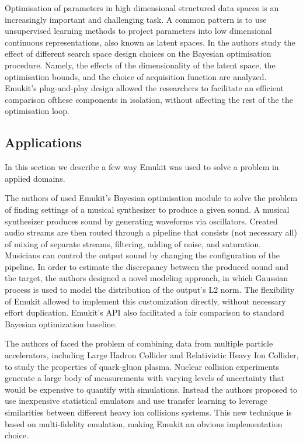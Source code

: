 Optimisation of parameters in high dimensional structured data spaces is an increasingly important and challenging task. A common pattern is to use unsupervised learning methods to project parameters into low dimensional continuous representations, also known as latent spaces. In \cite{siivola2021good} the authors study the effect of different search space design choices on the Bayesian optimisation procedure. Namely, the effects of the dimensionality of the latent space, the optimisation bounds, and the choice of acquisition function are analyzed. Emukit's plug-and-play design allowed the researchers to facilitate an efficient comparison ofthese components in isolation, without affecting the rest of the the optimisation loop.


\subsection{Applications}
In this section we describe a few way Emukit was used to solve a problem in applied domains.

The authors of \cite{uhrenholt2019efficient} used Emukit's Bayesian optimisation module to solve the problem of finding settings of a musical synthesizer to produce a given sound. A musical synthesizer produces sound by generating waveforms via oscillators. Created audio streams are then routed through a pipeline that consists (not necessary all) of mixing of separate streams, filtering, adding of noise, and saturation. Musicians can control the output sound by changing the configuration of the pipeline. In order to estimate the discrepancy between the produced sound and the target, the authors designed a novel modeling approach, in which Gaussian process is used to model the distribution of the output's L2 norm. The flexibility of Emukit allowed to implement this customization directly, without necessary effort duplication. Emukit's API also facilitated a fair comparison to standard Bayesian optimization baseline.

The authors of \cite{PhysRevC105034910} faced the problem of combining data from multiple particle accelerators, including Large Hadron Collider and Relativistic Heavy Ion Collider, to study the properties of quark-gluon plasma. Nuclear collision experiments generate a large body of measurements with varying levels of uncertainty that would be expensive to quantify with simulations. Instead the authors proposed to use inexpensive statistical emulators and use transfer learning to leverage similarities between different heavy ion collisions systems. This new technique is based on multi-fidelity emulation, making Emukit an obvious implementation choice.

